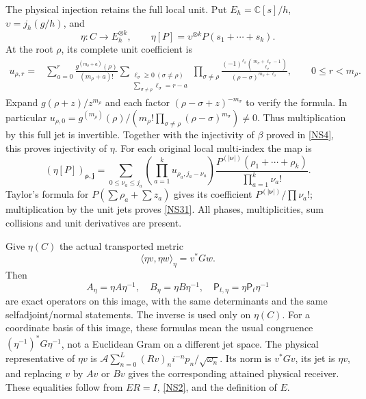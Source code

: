\documentclass[11pt]{article}
\newcommand{\C}{\mathbb C}\newcommand{\R}{\mathbb R}
\begin{document}
The physical injection retains the full local unit.
Put $E_h=\C[s]/h$, $\upsilon=j_h(g/h)$, and
\begin{equation}\tag{NS29}\label{NS29}
\eta:C\longrightarrow E_h^{\otimes k},\qquad
\eta[P]=\upsilon^{\otimes k}P(s_1+\cdots+s_k).
\end{equation}
At the root $\rho$, its complete unit coefficient is
\begin{equation}\tag{NS30}\label{NS30}
\begin{split}
u_{\rho,r}
={}&\sum_{a=0}^r
\frac{g^{(m_\rho+a)}(\rho)}{(m_\rho+a)!}
\sum_{\substack{\ell_\sigma\geq0\ (\sigma\ne\rho)\\
                 \sum_{\sigma\ne\rho}\ell_\sigma=r-a}}
\prod_{\sigma\ne\rho}
\frac{(-1)^{\ell_\sigma}
 \binom{m_\sigma+\ell_\sigma-1}{\ell_\sigma}}
 {(\rho-\sigma)^{m_\sigma+\ell_\sigma}},
\qquad 0\leq r<m_\rho .
\end{split}
\end{equation}
Expand $g(\rho+z)/z^{m_\rho}$ and each factor
$(\rho-\sigma+z)^{-m_\sigma}$ to verify the formula.
In particular
$u_{\rho,0}=g^{(m_\rho)}(\rho)/
(m_\rho!\prod_{\sigma\ne\rho}(\rho-\sigma)^{m_\sigma})\ne0$.
Thus multiplication by this full jet is invertible.
Together with the injectivity of $\beta$ proved in
\eqref{NS4}, this proves injectivity of $\eta$.
For each original local multi-index the map is
\begin{equation}\tag{NS31}\label{NS31}
(\eta[P])_{\boldsymbol\rho,\boldsymbol j}
=\sum_{0\leq\nu_a\leq j_a}
 \left(\prod_{a=1}^k u_{\rho_a,j_a-\nu_a}\right)
 \frac{P^{(|\boldsymbol\nu|)}(\rho_1+\cdots+\rho_k)}
      {\prod_{a=1}^k\nu_a!}.
\end{equation}
Taylor's formula for $P(\sum\rho_a+\sum z_a)$ gives its
coefficient $P^{(|\boldsymbol\nu|)}/\prod\nu_a!$;
multiplication by the unit jets proves \eqref{NS31}.
All phases, multiplicities, sum collisions and unit
derivatives are present.

Give $\eta(C)$ the actual transported metric
\[
\langle\eta v,\eta w\rangle_\eta=v^*Gw.
\]
Then
\begin{equation}\tag{NS32}\label{NS32}
A_\eta=\eta A\eta^{-1},\quad
B_\eta=\eta B\eta^{-1},\quad
\mathsf P_{t,\eta}=\eta\mathsf P_t\eta^{-1}
\end{equation}
are exact operators on this image, with the same
determinants and the same selfadjoint/normal statements.
The inverse is used only on $\eta(C)$.
For a coordinate basis of this image, these formulas
mean the usual congruence $(\eta^{-1})^*G\eta^{-1}$,
not a Euclidean Gram on a different jet space.
The physical representative of $\eta v$ is
$\mathcal A\sum_{n=0}^L (Rv)_n i^{-n}p_n/\sqrt{\omega_n}$.
Its norm is $v^*Gv$, its jet is $\eta v$, and replacing
$v$ by $Av$ or $Bv$ gives the corresponding attained
physical receiver. These equalities follow from
$ER=I$, \eqref{NS2}, and the definition of $E$.
\end{document}
